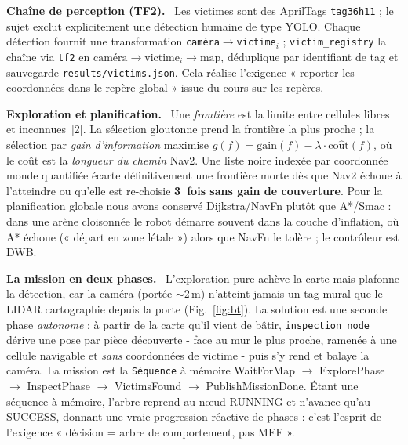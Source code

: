 \documentclass[10pt,twocolumn,a4paper]{article}
\newcommand{\head}[1]{\par\smallskip\noindent\textbf{\color{nccblue}#1}\ \ignorespaces}
\begin{document}
\head{Cha\^ine de perception (TF2).} Les victimes sont des AprilTags \texttt{tag36h11} ; le sujet exclut
explicitement une d\'etection humaine de type YOLO. Chaque d\'etection fournit une transformation
\texttt{cam\'era}$\to$\texttt{victime}$_i$ ; \texttt{victim\_registry} la cha\^ine via \texttt{tf2} en
$\text{cam\'era}\to\text{victime}_i\to\text{map}$, d\'eduplique par identifiant de tag et sauvegarde
\texttt{results/victims.json}. Cela r\'ealise l'exigence « reporter les coordonn\'ees dans le rep\`ere
global » issue du cours sur les rep\`eres.

\head{Exploration et planification.} Une \emph{fronti\`ere} est la limite entre cellules libres et
inconnues~[2]. La s\'election gloutonne prend la fronti\`ere la plus proche ; la s\'election par
\emph{gain d'information} maximise $g(f)=\mathrm{gain}(f)-\lambda\cdot\mathrm{co\hat ut}(f)$, o\`u le
co\^ut est la \emph{longueur du chemin} Nav2. Une liste noire index\'ee par coordonn\'ee monde quantifi\'ee
\'ecarte d\'efinitivement une fronti\`ere morte d\`es que Nav2 \'echoue \`a l'atteindre ou qu'elle est
re-choisie \textbf{3~fois sans gain de couverture}. Pour la planification globale nous avons conserv\'e Dijkstra/NavFn plut\^ot
que A*/Smac : dans une ar\`ene cloisonn\'ee le robot d\'emarre souvent dans la couche d'inflation, o\`u
A* \'echoue (« d\'epart en zone l\'etale ») alors que NavFn le tol\`ere ; le contr\^oleur est DWB.

\head{La mission en deux phases.} L'exploration pure ach\`eve la carte mais plafonne la d\'etection, car
la cam\'era (port\'ee $\sim$2\,m) n'atteint jamais un tag mural que le LIDAR cartographie depuis la porte
(Fig.~\ref{fig:bt}). La solution est une seconde phase \emph{autonome} : \`a partir de la carte qu'il vient
de b\^atir, \texttt{inspection\_node} d\'erive une pose par pi\`ece d\'ecouverte - face au mur le plus
proche, ramen\'ee \`a une cellule navigable et \emph{sans} coordonn\'ees de victime - puis s'y rend et
balaye la cam\'era. La mission est la \texttt{S\'equence} \`a m\'emoire \textsf{WaitForMap $\to$
ExplorePhase $\to$ InspectPhase $\to$ VictimsFound $\to$ PublishMissionDone}. \'Etant une s\'equence \`a
m\'emoire, l'arbre reprend au n\oe ud RUNNING et n'avance qu'au SUCCESS, donnant une vraie progression
r\'eactive de phases : c'est l'esprit de l'exigence « d\'ecision = arbre de comportement, pas MEF ».
\end{document}
